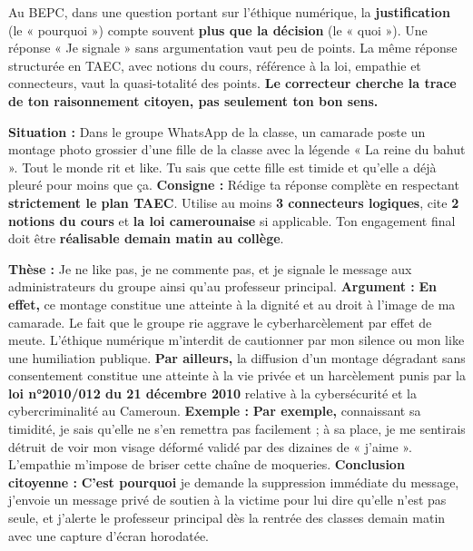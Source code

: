\documentclass[11pt]{article}
\newcommand{\cle}[1]{{\popxbold\color{popdark}#1}}
\begin{document}
\begin{savaistu}
\noindent Au BEPC, dans une question portant sur l'éthique numérique, la \textbf{justification} (le « pourquoi ») compte souvent \textbf{plus que la décision} (le « quoi »). Une réponse « Je signale » sans argumentation vaut peu de points. La même réponse structurée en TAEC, avec notions du cours, référence à la loi, empathie et connecteurs, vaut la quasi-totalité des points. \textbf{Le correcteur cherche la trace de ton raisonnement citoyen, pas seulement ton bon sens.}
\end{savaistu}

\begin{exercice}
\noindent\textbf{Situation :} Dans le groupe WhatsApp de la classe, un camarade poste un montage photo grossier d'une fille de la classe avec la légende « La reine du bahut ». Tout le monde rit et like. Tu sais que cette fille est timide et qu'elle a déjà pleuré pour moins que ça.
\smallskip
\noindent\textbf{Consigne :} Rédige ta réponse complète en respectant \textbf{strictement le plan TAEC}. Utilise au moins \textbf{3 connecteurs logiques}, cite \textbf{2 notions du cours} et \textbf{la loi camerounaise} si applicable. Ton engagement final doit être \textbf{réalisable demain matin au collège}.
\end{exercice}

\begin{corrige}
\noindent\textbf{Thèse :} Je ne like pas, je ne commente pas, et je signale le message aux administrateurs du groupe ainsi qu'au professeur principal.
\smallskip
\noindent\textbf{Argument :} \textbf{En effet,} ce montage constitue une \cle{atteinte à la dignité} et au \cle{droit à l'image} de ma camarade. Le fait que le groupe rie aggrave le \cle{cyberharcèlement} par effet de meute. L'\cle{éthique} numérique m'interdit de cautionner par mon silence ou mon like une humiliation publique. \textbf{Par ailleurs,} la diffusion d'un montage dégradant sans consentement constitue une atteinte à la vie privée et un harcèlement punis par la \textbf{loi n°2010/012 du 21 décembre 2010} relative à la cybersécurité et la cybercriminalité au Cameroun.
\smallskip
\noindent\textbf{Exemple :} \textbf{Par exemple,} connaissant sa timidité, je sais qu'elle ne s'en remettra pas facilement ; à sa place, je me sentirais détruit de voir mon visage déformé validé par des dizaines de « j'aime ». L'\cle{empathie} m'impose de briser cette chaîne de moqueries.
\smallskip
\noindent\textbf{Conclusion citoyenne :} \textbf{C'est pourquoi} je demande la suppression immédiate du message, j'envoie un message privé de soutien à la victime pour lui dire qu'elle n'est pas seule, et j'alerte le professeur principal dès la rentrée des classes demain matin avec une capture d'écran horodatée.
\end{corrige}
\end{document}
